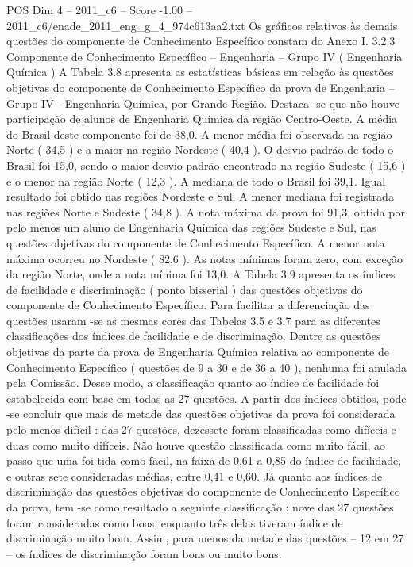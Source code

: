 \begin{textsample}{POS Dim 4 – 2011\_c6 – Score -1.00 – 2011\_c6/enade\_2011\_eng\_g\_4\_974c613aa2.txt}
Os gráficos relativos às demais questões do componente de Conhecimento Específico constam do Anexo I. 3.2.3 Componente de Conhecimento Específico – Engenharia – Grupo IV ( Engenharia Química ) A Tabela 3.8 apresenta as estatísticas básicas em relação às questões objetivas do componente de Conhecimento Específico da prova de Engenharia – Grupo IV - Engenharia Química, por Grande Região.
Destaca -se que não houve participação de alunos de Engenharia Química da região Centro-Oeste.
A média do Brasil deste componente foi de 38,0.
A menor média foi observada na região Norte ( 34,5 ) e a maior na região Nordeste ( 40,4 ).
O desvio padrão de todo o Brasil foi 15,0, sendo o maior desvio padrão encontrado na região Sudeste ( 15,6 ) e o menor na região Norte ( 12,3 ).
A mediana de todo o Brasil foi 39,1.
Igual resultado foi obtido nas regiões Nordeste e Sul.
A menor mediana foi registrada nas regiões Norte e Sudeste ( 34,8 ).
A nota máxima da prova foi 91,3, obtida por pelo menos um aluno de Engenharia Química das regiões Sudeste e Sul, nas questões objetivas do componente de Conhecimento Específico.
A menor nota máxima ocorreu no Nordeste ( 82,6 ).
As notas mínimas foram zero, com exceção da região Norte, onde a nota mínima foi 13,0.
A Tabela 3.9 apresenta os índices de facilidade e discriminação ( ponto bisserial ) das questões objetivas do componente de Conhecimento Específico.
Para facilitar a diferenciação das questões usaram -se as mesmas cores das Tabelas 3.5 e 3.7 para as diferentes classificações dos índices de facilidade e de discriminação.
Dentre as questões objetivas da parte da prova de Engenharia Química relativa ao componente de Conhecimento Específico ( questões de 9 a 30 e de 36 a 40 ), nenhuma foi anulada pela Comissão.
Desse modo, a classificação quanto ao índice de facilidade foi estabelecida com base em todas as 27 questões.
A partir dos índices obtidos, pode -se concluir que mais de metade das questões objetivas da prova foi considerada pelo menos difícil : das 27 questões, dezessete foram classificadas como difíceis e duas como muito difíceis.
Não houve questão classificada como muito fácil, ao passo que uma foi tida como fácil, na faixa de 0,61 a 0,85 do índice de facilidade, e outras sete consideradas médias, entre 0,41 e 0,60.
Já quanto aos índices de discriminação das questões objetivas do componente de Conhecimento Específico da prova, tem -se como resultado a seguinte classificação : nove das 27 questões foram consideradas como boas, enquanto três delas tiveram índice de discriminação muito bom.
Assim, para menos da metade das questões – 12 em 27 – os índices de discriminação foram bons ou muito bons.

\end{textsample}
